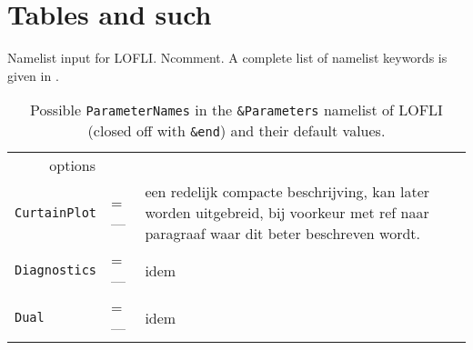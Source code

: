 \documentclass[fleqn,11pt]{article}
\begin{document}
\section{Tables and such}

Namelist input for LOFLI.
Ncomment. A complete list of namelist keywords is given in .

\begin{table}[!ht]
\caption{Possible {\tt ParameterNames} in the {\tt \&Parameters} namelist of LOFLI (closed off with {\tt \&end}) and their default values.
}
\begin{tabular}{|l l |p{11cm}|}
\hline
\multicolumn{2}{|c|}{options}
\\
\verb!CurtainPlot! & =  ---  &   een redelijk compacte beschrijving, kan later worden uitgebreid, bij voorkeur met ref naar paragraaf waar dit beter beschreven wordt.
\\
\verb!Diagnostics! & =  ---  &    idem
\\  \verb!Dual! & =  ---  &    idem
\\\hline
\end{tabular}
\end{table}
\end{document}
